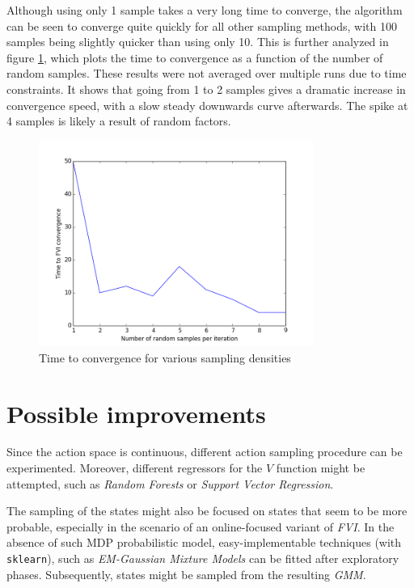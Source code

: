 \documentclass[a4paper, 12pt]{article}
\begin{document}
Although using only 1 sample takes a very long time to converge, the algorithm
can be seen to converge quite quickly for all other sampling methods, with 100
samples being slightly quicker than using only 10. This is further analyzed in
figure \ref{fig:n}, which plots the time to convergence as a function of the
number of random samples. These results were not averaged over multiple runs due
to time constraints. It shows that going from 1 to 2 samples gives a dramatic
increase in convergence speed, with a slow steady downwards curve afterwards.
The spike at 4 samples is likely a result of random factors.

\begin{figure}[htb]
  \centering
  \includegraphics[width=0.8\textwidth]{n_samples.png}
  \caption{Time to convergence for various sampling densities}
  \label{fig:n}
\end{figure}

\FloatBarrier

\section*{Possible improvements}

Since the action space is continuous, different action sampling procedure
can be experimented. Moreover, different regressors for the 
$V$ function might be attempted,
such as \emph{Random Forests} or \emph{Support Vector Regression}.

The sampling of the states might also be focused on states that 
seem to be more probable, especially in the scenario of 
an online-focused variant
of \emph{FVI}. In the absence of such MDP probabilistic model,
easy-implementable techniques (with \texttt{sklearn}), such as
\emph{EM-Gaussian Mixture Models} can be fitted
after exploratory phases. Subsequently,
states might be sampled from the resulting \emph{GMM}.
\end{document}
